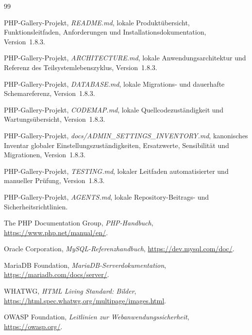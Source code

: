 \documentclass[11pt,a4paper]{article}
\newcommand{\version}{1.8.3}
\begin{document}
\begin{thebibliography}{99}

PHP-Gallery-Projekt, \emph{README.md}, lokale Produktübersicht,
Funktionsleitfaden, Anforderungen und Installationsdokumentation,
Version~\version.

PHP-Gallery-Projekt, \emph{ARCHITECTURE.md}, lokale Anwendungsarchitektur und
Referenz des Teilsystemlebenszyklus, Version~\version.

PHP-Gallery-Projekt, \emph{DATABASE.md}, lokale Migrations- und dauerhafte
Schemareferenz, Version~\version.

PHP-Gallery-Projekt, \emph{CODEMAP.md}, lokale Quellcodezuständigkeit und
Wartungsübersicht, Version~\version.

PHP-Gallery-Projekt, \emph{docs/ADMIN\_SETTINGS\_INVENTORY.md}, kanonisches
Inventar globaler Einstellungszuständigkeiten, Ersatzwerte, Sensibilität und
Migrationen, Version~\version.

PHP-Gallery-Projekt, \emph{TESTING.md}, lokaler Leitfaden automatisierter und
manueller Prüfung, Version~\version.

PHP-Gallery-Projekt, \emph{AGENTS.md}, lokale Repository-Beitrags- und
Sicherheitsrichtlinien.

The PHP Documentation Group, \emph{PHP-Handbuch},
\url{https://www.php.net/manual/en/}.

Oracle Corporation, \emph{MySQL-Referenzhandbuch},
\url{https://dev.mysql.com/doc/}.

MariaDB Foundation, \emph{MariaDB-Serverdokumentation},
\url{https://mariadb.com/docs/server/}.

WHATWG, \emph{HTML Living Standard: Bilder},
\url{https://html.spec.whatwg.org/multipage/images.html}.

OWASP Foundation, \emph{Leitlinien zur Webanwendungssicherheit},
\url{https://owasp.org/}.

\end{thebibliography}

\clearpage
{}
{}
\printindex
\end{document}
